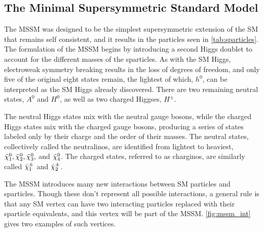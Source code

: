 \subsection{The Minimal Supersymmetric Standard Model}

The \acf{MSSM} was designed to be the simplest supersymmetric extension of the \ac{SM} that remains self consistent, and it results in the particles seen in \autoref{tab:sparticles}\cite{Martin:1997ns}. The formulation of the \ac{MSSM} begins by introducing a second Higgs doublet to account for the different masses of the sparticles. As with the \ac{SM} Higgs, electroweak symmetry breaking results in the loss of degrees of freedom, and only five of the original eight states remain, the lightest of which, $h^0$, can be interpreted as the \ac{SM} Higgs already discovered. There are two remaining neutral states, $A^0$ and $H^0$, as well as two charged Higgses, $H^\pm$. 

The neutral Higgs states mix with the neutral gauge bosons, while the charged Higgs states mix with the charged gauge bosons, producing a series of states labeled only by their charge and the order of their masses. The neutral states, collectively called the neutralinos, are identified from lightest to heaviest, $\No[1], \No[2], \No[3],$ and $\No[4]$. The charged states, referred to as charginos, are similarly called $\Co[1]$ and $\Co[2]$.

The \ac{MSSM} introduces many new interactions between \ac{SM} particles and sparticles. Though these don't represent all possible interactions, a general rule is that any \ac{SM} vertex can have two interacting particles replaced with their sparticle equivalents, and this vertex will be part of the \ac{MSSM}. \autoref{fig:mssm_int} gives two examples of such vertices. 

